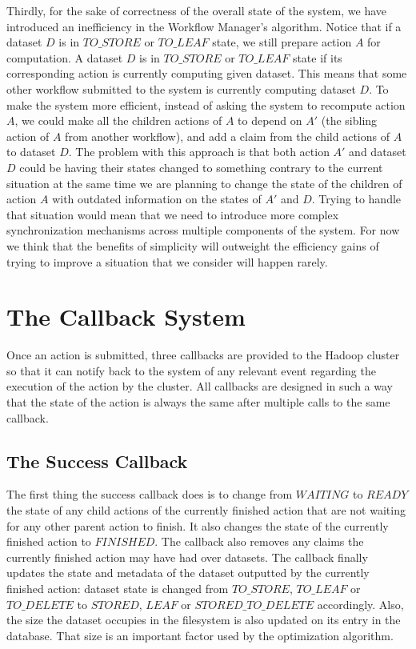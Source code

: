 Thirdly, for the sake of correctness of the overall state of the system, we have introduced an inefficiency in the Workflow Manager's algorithm. Notice that if a dataset $D$ is in $TO\_STORE$ or $TO\_LEAF$ state, we still prepare action $A$ for computation. A dataset $D$ is in $TO\_STORE$ or $TO\_LEAF$ state if its corresponding action is currently computing given dataset. This means that some other workflow submitted to the system is currently computing dataset $D$. To make the system more efficient, instead of asking the system to recompute action $A$, we could make all the children actions of $A$ to depend on $A'$ (the sibling action of $A$ from another workflow), and add a claim from the child actions of $A$ to dataset $D$. The problem with this approach is that both action $A'$ and dataset $D$ could be having their states changed to something contrary to the current situation at the same time we are planning to change the state of the children of action $A$ with outdated information on the states of $A'$ and $D$. Trying to handle that situation would mean that we need to introduce more complex synchronization mechanisms across multiple components of the system. For now we think that the benefits of simplicity will outweight the efficiency gains of trying to improve a situation that we consider will happen rarely.

\section{The Callback System}
Once an action is submitted, three callbacks are provided to the Hadoop cluster so that it can notify back to the system of any relevant event regarding the execution of the action by the cluster. All callbacks are designed in such a way that the state of the action is always the same after multiple calls to the same callback.

\subsection{The Success Callback}
The first thing the success callback does is to change from $WAITING$ to $READY$ the state of any child actions of the currently finished action that are not waiting for any other parent action to finish. It also changes the state of the currently finished action to $FINISHED$. The callback also removes any claims the currently finished action may have had over datasets. The callback finally updates the state and metadata of the dataset outputted by the currently finished action: dataset state is changed from $TO\_STORE$, $TO\_LEAF$ or $TO\_DELETE$ to $STORED$, $LEAF$ or $STORED\_TO\_DELETE$ accordingly. Also, the size the dataset occupies in the filesystem is also updated on its entry in the database. That size is an important factor used by the optimization algorithm.

